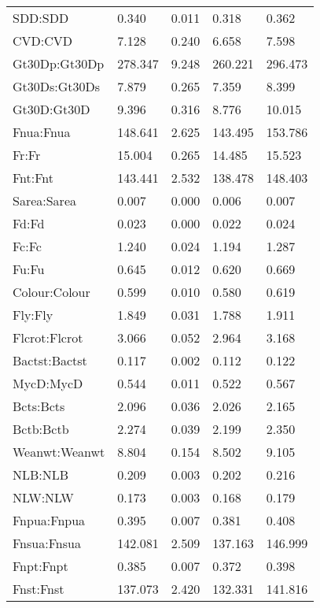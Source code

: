 \begin{center}
\begin{longtable}{|p{1.5in}|p{0.8in}|p{0.8in}|p{0.8in}|p{0.8in}|}
 SDD:SDD & 0.340 & 0.011 & 0.318 & 0.362 \\ 
 CVD:CVD & 7.128 & 0.240 & 6.658 & 7.598 \\ 
 Gt30Dp:Gt30Dp & 278.347 & 9.248 & 260.221 & 296.473 \\ 
 Gt30Ds:Gt30Ds & 7.879 & 0.265 & 7.359 & 8.399 \\ 
 Gt30D:Gt30D & 9.396 & 0.316 & 8.776 & 10.015 \\ 
 Fnua:Fnua & 148.641 & 2.625 & 143.495 & 153.786 \\ 
 Fr:Fr & 15.004 & 0.265 & 14.485 & 15.523 \\ 
 Fnt:Fnt & 143.441 & 2.532 & 138.478 & 148.403 \\ 
 Sarea:Sarea & 0.007 & 0.000 & 0.006 & 0.007 \\ 
 Fd:Fd & 0.023 & 0.000 & 0.022 & 0.024 \\ 
 Fc:Fc & 1.240 & 0.024 & 1.194 & 1.287 \\ 
 Fu:Fu & 0.645 & 0.012 & 0.620 & 0.669 \\ 
 Colour:Colour & 0.599 & 0.010 & 0.580 & 0.619 \\ 
 Fly:Fly & 1.849 & 0.031 & 1.788 & 1.911 \\ 
 Flcrot:Flcrot & 3.066 & 0.052 & 2.964 & 3.168 \\ 
 Bactst:Bactst & 0.117 & 0.002 & 0.112 & 0.122 \\ 
 MycD:MycD & 0.544 & 0.011 & 0.522 & 0.567 \\ 
 Bcts:Bcts & 2.096 & 0.036 & 2.026 & 2.165 \\ 
 Bctb:Bctb & 2.274 & 0.039 & 2.199 & 2.350 \\ 
 Weanwt:Weanwt & 8.804 & 0.154 & 8.502 & 9.105 \\ 
 NLB:NLB & 0.209 & 0.003 & 0.202 & 0.216 \\ 
 NLW:NLW & 0.173 & 0.003 & 0.168 & 0.179 \\ 
 Fnpua:Fnpua & 0.395 & 0.007 & 0.381 & 0.408 \\ 
 Fnsua:Fnsua & 142.081 & 2.509 & 137.163 & 146.999 \\ 
 Fnpt:Fnpt & 0.385 & 0.007 & 0.372 & 0.398 \\ 
 Fnst:Fnst & 137.073 & 2.420 & 132.331 & 141.816 \\ 
 \hline
\end{longtable}
\end{center}
%

